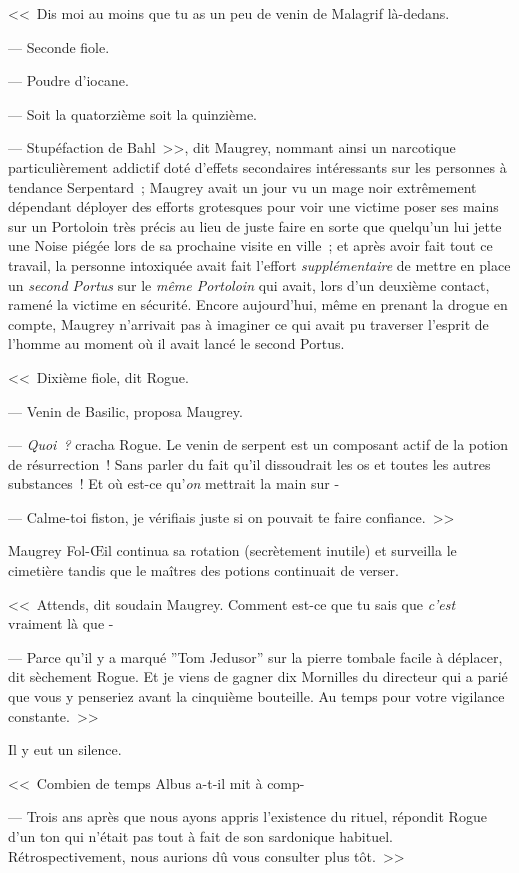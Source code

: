 <<~Dis moi au moins que tu as un peu de venin de Malagrif là-dedans.

--- Seconde fiole.

--- Poudre d'iocane.

--- Soit la quatorzième soit la quinzième.

--- Stupéfaction de Bahl~>>, dit Maugrey, nommant ainsi un narcotique particulièrement addictif doté d'effets secondaires intéressants sur les personnes à tendance Serpentard~; Maugrey avait un jour vu un mage noir extrêmement dépendant déployer des efforts grotesques pour voir une victime poser ses mains sur un Portoloin très précis au lieu de juste faire en sorte que quelqu'un lui jette une Noise piégée lors de sa prochaine visite en ville~; et après avoir fait tout ce travail, la personne intoxiquée avait fait l'effort \emph{supplémentaire} de mettre en place un \emph{second Portus} sur le \emph{même Portoloin} qui avait, lors d'un deuxième contact, ramené la victime en sécurité. Encore aujourd'hui, même en prenant la drogue en compte, Maugrey n'arrivait pas à imaginer ce qui avait pu traverser l'esprit de l'homme au moment où il avait lancé le second Portus.

<<~Dixième fiole, dit Rogue.

--- Venin de Basilic, proposa Maugrey.

--- \emph{Quoi~?} cracha Rogue. Le venin de serpent est un composant actif de la potion de résurrection~! Sans parler du fait qu'il dissoudrait les os et toutes les autres substances~! Et où est-ce qu'\emph{on} mettrait la main sur -

--- Calme-toi fiston, je vérifiais juste si on pouvait te faire confiance.~>>

Maugrey Fol-Œil continua sa rotation (secrètement inutile) et surveilla le cimetière tandis que le maîtres des potions continuait de verser.

<<~Attends, dit soudain Maugrey. Comment est-ce que tu sais que \emph{c'est} vraiment là que -

--- Parce qu'il y a marqué ”Tom Jedusor” sur la pierre tombale facile à déplacer, dit sèchement Rogue. Et je viens de gagner dix Mornilles du directeur qui a parié que vous y penseriez avant la cinquième bouteille. Au temps pour votre vigilance constante.~>>

Il y eut un silence.

<<~Combien de temps Albus a-t-il mit à comp-

--- Trois ans après que nous ayons appris l'existence du rituel, répondit Rogue d'un ton qui n'était pas tout à fait de son sardonique habituel. Rétrospectivement, nous aurions dû vous consulter plus tôt.~>>

